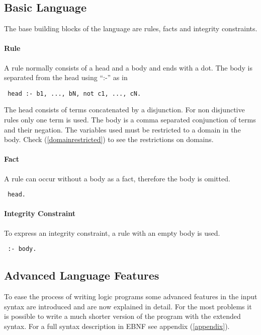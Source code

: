 \documentclass[a4paper,10pt]{article}
\begin{document}
\subsection{Basic Language}
The base building blocks of the language are rules, facts and integrity constraints.
\paragraph{Rule}
A rule normally consists of a head and a body and ends with a dot.
The body is separated from the head using ``:-'' as in
\begin{verbatim}
 head :- b1, ..., bN, not c1, ..., cN.
\end{verbatim}
The head consists of terms concatenated by a disjunction. For non disjunctive rules only one term is used.
The body is a comma separated conjunction of terms and their negation.
The variables used must be restricted to a domain in the body.
Check (\ref{domainrestricted}) to see the restrictions on domains.
\paragraph{Fact}
A rule can occur without a body as a fact, therefore the body is omitted.
\begin{verbatim}
 head.
\end{verbatim}
\paragraph{Integrity Constraint}
To express an integrity constraint, a rule with an empty body is used.
\begin{verbatim}
 :- body.
\end{verbatim}

\subsection{Advanced Language Features}
To ease the process of writing logic programs some advanced features in the input syntax are introduced and are now explained in detail.
For the most problems it is possible to write a much shorter version of the program with the extended syntax.
For a full syntax description in EBNF see appendix (\ref{appendix}).
\end{document}
